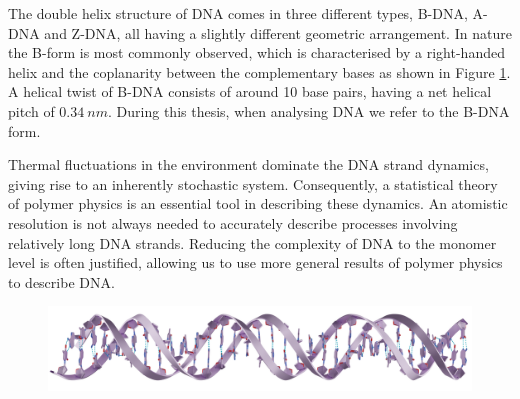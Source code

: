 The double helix structure of DNA comes in three different types, B-DNA, A-DNA and Z-DNA,
all having a slightly different geometric arrangement. In nature the B-form is most
commonly observed, which is characterised by a right-handed helix and the coplanarity
between the complementary bases as shown in Figure \ref{fig:DNA}. A helical twist of
B-DNA consists of around 10 base pairs, having a net helical pitch of $0.34\ nm$. During
this thesis, when analysing DNA we refer to the B-DNA form.


Thermal fluctuations in the environment dominate the DNA strand dynamics, giving rise to
an inherently stochastic system. Consequently, a statistical theory of polymer physics
is an essential tool in describing these dynamics.  An atomistic
resolution is not always needed to accurately describe processes involving
relatively long DNA strands.  Reducing the complexity of DNA to the monomer level is
often justified, allowing us to use more general results of polymer physics to describe
DNA.

\begin{figure}[h!]
   \centering
   \includegraphics[width=\linewidth]{Figures/DNAStrand2.png}
   \caption[Figure showing the double helical structure of
   DNA.]{}
   \label{fig:DNA}
\end{figure}
